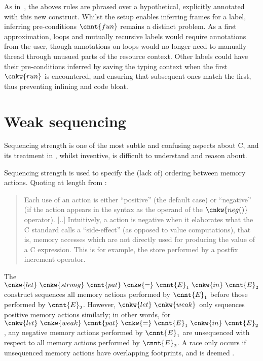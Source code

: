 As in~, the aboves rules are phrased over a
hypothetical, explicitly annotated  with this new construct. Whilst
the setup enables inferring frames for a label, inferring pre-conditions
$\cnnt{fun}$ remains a distinct problem. As a first approximation, loops and
mutually recursive labels would require annotations from the user, though
annotations on loops would no longer need to manually thread through unusued
parts of the resource context. Other labels could have their pre-conditions
inferred by saving the typing context when the first $\cnkw{run}$ is
encountered, and ensuring that subsequent ones match the first, thus preventing
inlining and code bloat.

\section{Weak sequencing}

Sequencing strength is one of the most subtle and confusing aspects about C,
and its treatment in , whilst inventive, is difficult to understand
and reason about.

Sequencing strength is used to specify the (lack of) ordering between memory
actions. Quoting at length from :

\begin{quote}
 Each use of an action is either ``positive'' (the default case) or
 ``negative'' (if the action appears in the syntax as the operand of the
 $\cnkw{neg()}$ operator). [..] Intuitively, a  action is negative
 when it elaborates what the C standard calls a ``side-effect'' (as opposed to
 value computations), that is, memory accesses which are not directly used for
 producing the value of a C expression. This is for example, the store
 performed by a postfix increment operator.
\end{quote}

The $\cnkw{let}\ \cnkw{strong}\ \cnnt{pat}\ \cnkw{=}\ \cnnt{E}_1\ \cnkw{in}\
\cnnt{E}_2$ construct sequences all memory actions performed by $\cnnt{E}_1$
before those performed by $\cnnt{E}_2$. However, $\cnkw{let}\ \cnkw{weak}$ only
sequences positive memory actions similarly; in other words, for $\cnkw{let}\
\cnkw{weak}\ \cnnt{pat}\ \cnkw{=}\ \cnnt{E}_1\ \cnkw{in}\ \cnnt{E}_2$, any
negative memory actions performed by $\cnnt{E}_1$ are unsequenced with respect
to all memory actions performed by $\cnnt{E}_2$. A race only occurs if
unsequenced memory actions have overlapping footprints, and is deemed \kl{UB}.

